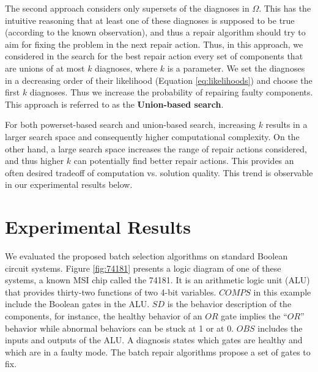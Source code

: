 \documentclass[letterpaper]{article}
\newcommand{\COMPS}{\textit{COMPS}}
\newcommand{\SD}{\textit{SD}}
\newcommand{\OBS}{\textit{OBS}}
\begin{document}
The second approach considers only supersets of the diagnoses in $\Omega$. This has the intuitive reasoning that at least one of these diagnoses is supposed to be true (according to the known observation), and thus a repair algorithm should try to aim for fixing the problem in the next repair action. Thus, in this approach, we considered in the search for the best repair action every set of components that are unions of at most $k$ diagnoses, where $k$ is a parameter. We set the diagnoses in a decreasing order of their likelihood (Equation \ref{eq:likelihoods}) and choose the first $k$ diagnoses. Thus we increase the probability of repairing faulty components. This approach is referred to as the {\bf Union-based search}. %

For both powerset-based search and union-based search, increasing $k$ results in a larger search space and consequently higher computational complexity. On the other hand, a large search space increases the range of repair actions considered, and thus higher $k$ can potentially find better repair actions. This provides an often desired tradeoff of computation vs. solution quality. This trend is observable in our experimental results below.


\section{Experimental Results}

We evaluated the proposed batch selection algorithms on standard Boolean circuit systems. Figure \ref{fig:74181} presents a logic diagram of one of these systems, a known MSI chip called the 74181. It is an arithmetic logic unit (ALU) that provides thirty-two functions of two 4-bit variables. $\COMPS$ in this example include the Boolean gates in the ALU. $\SD$ is the behavior description of the components, for instance, the healthy behavior of an $\textit{OR}$ gate implies the ``$\textit{OR}$'' behavior while abnormal behaviors can be stuck at 1 or at 0. $\OBS$ includes the inputs and outputs of the ALU. A diagnosis states which gates are healthy and which are in a faulty mode. The batch repair algorithms propose a set of gates to fix.
\end{document}
